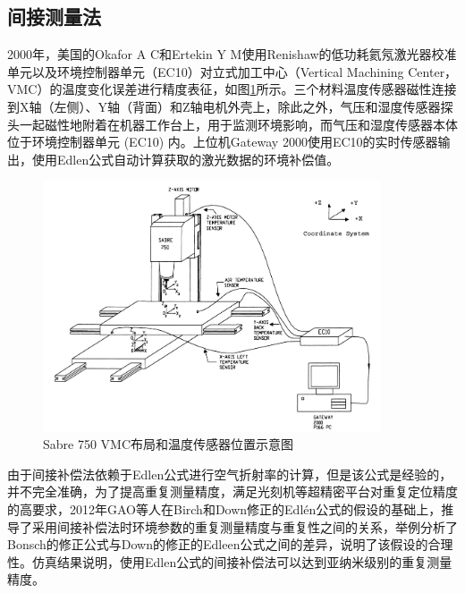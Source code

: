 \subsection{间接测量法}
2000年，美国的Okafor A C和Ertekin Y M使用Renishaw的低功耗氦氖激光器校准单元以及环境控制器单元（EC10）对立式加工中心（Vertical Machining Center，VMC）的温度变化误差进行精度表征，如图\ref{fig:Sabre 750 VMC 布局和温度传感器位置示意图}所示\cite{2000Vertical}。三个材料温度传感器磁性连接到X轴（左侧）、Y轴（背面）和Z轴电机外壳上，除此之外，气压和湿度传感器探头一起磁性地附着在机器工作台上，用于监测环境影响，而气压和湿度传感器本体位于环境控制器单元 (EC10) 内。上位机Gateway 2000使用EC10的实时传感器输出，使用Edlen公式自动计算获取的激光数据的环境补偿值。
\begin{figure}[htb]
  \centering
  \includegraphics[width=10cm]{fig/1-fig/EC10.jpg}
  \caption{Sabre 750 VMC布局和温度传感器位置示意图}
  \label{fig:Sabre 750 VMC 布局和温度传感器位置示意图}
\end{figure}

由于间接补偿法依赖于Edlen公式进行空气折射率的计算，但是该公式是经验的，并不完全准确，为了提高重复测量精度，满足光刻机等超精密平台对重复定位精度的高要求，2012年GAO等人在Birch和Down修正的Edlén公式的假设的基础上，推导了采用间接补偿法时环境参数的重复测量精度与重复性之间的关系，举例分析了Bonsch的修正公式与Down的修正的Edleen公式之间的差异，说明了该假设的合理性。仿真结果说明，使用Edlen公式的间接补偿法可以达到亚纳米级别的重复测量精度。

